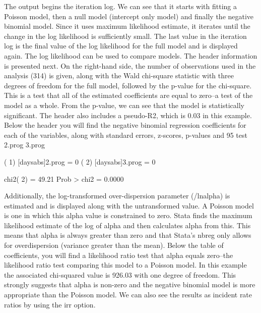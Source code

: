 The output begins the iteration log. We can see that it starts with fitting a Poisson model, then a null model (intercept only model) and finally the negative binomial model. Since it uses maximum likelihood estimate, it iterates until the change in the log likelihood is sufficiently small. The last value in the iteration log is the final value of the log likelihood for the full model and is displayed again.  The log likelihood can be used to compare models.
The header information is presented next.  On the right-hand side, the number of observations used in the analysis (314) is given, along with the Wald chi-square statistic with three degrees of freedom for the full model, followed by the p-value for the chi-square. This is a test that all of the estimated coefficients are equal to zero--a test of the model as a whole. From the p-value, we can see that the model is statistically significant. The header also includes a pseudo-R2, which is 0.03 in this example.
Below the header you will find the negative binomial regression coefficients for each of the variables, along with standard errors, z-scores, p-values and 95%
test 2.prog 3.prog

( 1)  [daysabs]2.prog = 0
( 2)  [daysabs]3.prog = 0

chi2(  2) =   49.21
Prob > chi2 =    0.0000

Additionally, the log-transformed over-dispersion parameter (/lnalpha) is estimated and is displayed along with the untransformed value. A Poisson model is one in which this alpha value is constrained to zero. Stata finds the maximum likelihood estimate of the log of alpha and then calculates alpha from this. This means that alpha is always greater than zero and that Stata's nbreg only allows for overdispersion (variance greater than the mean). 
Below the table of coefficients, you will find a likelihood ratio test that alpha equals zero--the likelihood ratio test comparing this model to a Poisson model.  In this example the associated chi-squared value is 926.03 with one degree of freedom.  This strongly suggests that alpha is non-zero and the negative binomial model is more appropriate than the Poisson model. 
We can also see the results as incident rate ratios by using the irr option.  

